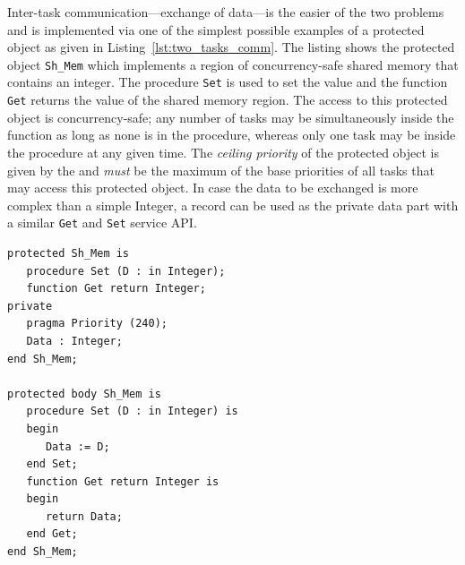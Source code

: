 Inter-task communication---exchange of data---is the easier of the two
problems and is implemented via one of the simplest possible examples
of a protected object as given in
Listing~\ref{lst:two_tasks_comm}. The listing shows the protected
object \texttt{Sh\_Mem} which implements a region of concurrency-safe
shared memory that contains an integer. The procedure \texttt{Set} is
used to set the value and the function \texttt{Get} returns the value
of the shared memory region. The access to this protected object is
concurrency-safe; any number of tasks may be simultaneously inside the
function as long as none is in the procedure, whereas only one task
may be inside the procedure at any given time. The \emph{ceiling
  priority} of the protected object is given by the  and \emph{must} be the maximum of the base priorities of
all tasks that may access this protected object. In case the data to be
exchanged is more complex than a simple Integer, a record can be used
as the private data part with a similar \texttt{Get} and \texttt{Set}
service API.



  

\begin{minipage}{\listingwidth}
\begin{lstlisting}[label=lst:two_tasks_comm, caption=Two periodic
    tasks communicating via a protected object]
protected Sh_Mem is
   procedure Set (D : in Integer);
   function Get return Integer;
private
   pragma Priority (240);
   Data : Integer;
end Sh_Mem;

protected body Sh_Mem is
   procedure Set (D : in Integer) is
   begin
      Data := D;
   end Set;
   function Get return Integer is
   begin
      return Data;
   end Get;
end Sh_Mem;
\end{lstlisting}
\end{minipage}



